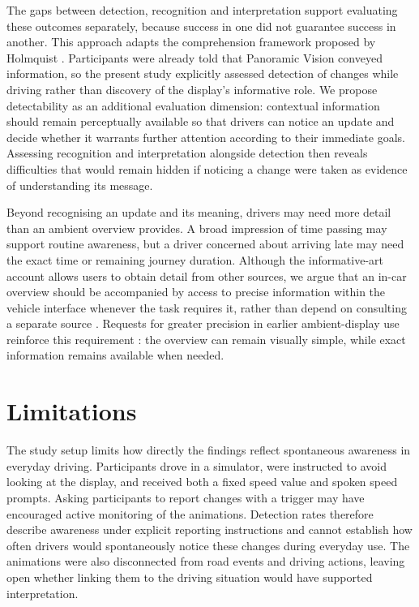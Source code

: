 \documentclass[
english,                 %
bibtex,                  %
includeExtraAbstracts, %
]{kththesis}
\numberwithin{listing}{chapter}
\begin{document}
The gaps between detection, recognition and interpretation support evaluating these outcomes separately, because success in one did not guarantee success in another. This approach adapts the comprehension framework proposed by Holmquist \cite{holmquistEvaluatingComprehensionAmbient2004}. Participants were already told that Panoramic Vision conveyed information, so the present study explicitly assessed detection of changes while driving rather than discovery of the display's informative role. We propose detectability as an additional evaluation dimension: contextual information should remain perceptually available so that drivers can notice an update and decide whether it warrants further attention according to their immediate goals. Assessing recognition and interpretation alongside detection then reveals difficulties that would remain hidden if noticing a change were taken as evidence of understanding its message.

Beyond recognising an update and its meaning, drivers may need more detail than an ambient overview provides. A broad impression of time passing may support routine awareness, but a driver concerned about arriving late may need the exact time or remaining journey duration. Although the informative-art account allows users to obtain detail from other sources, we argue that an in-car overview should be accompanied by access to precise information within the vehicle interface whenever the task requires it, rather than depend on consulting a separate source \cite{holmquistInformativeArtInformation2003}. Requests for greater precision in earlier ambient-display use reinforce this requirement \cite{staskoPersonalizedPeripheralInformation2004}: the overview can remain visually simple, while exact information remains available when needed.

\section{Limitations}
\label{sec:limitations}

The study setup limits how directly the findings reflect spontaneous awareness in everyday driving. Participants drove in a simulator, were instructed to avoid looking at the display, and received both a fixed speed value and spoken speed prompts. Asking participants to report changes with a trigger may have encouraged active monitoring of the animations. Detection rates therefore describe awareness under explicit reporting instructions and cannot establish how often drivers would spontaneously notice these changes during everyday use. The animations were also disconnected from road events and driving actions, leaving open whether linking them to the driving situation would have supported interpretation.
\end{document}
